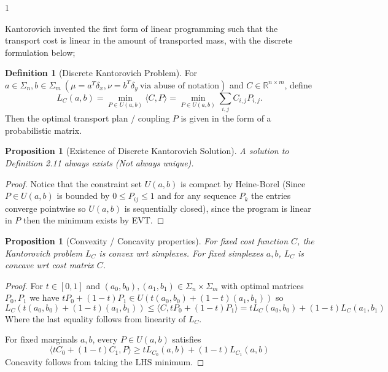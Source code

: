 \documentclass[12pt]{article}
\newtheorem{proposition}[theorem]{Proposition}
\theoremstyle{definition}
\newtheorem{definition}[theorem]{Definition}
\theoremstyle{plain}
\begin{document}
\begin{spacing}{1}
{Kantorovich invented the first form of linear programming such that the transport cost is linear in the amount of transported mass, with the discrete formulation below;

\begin{definition}[Discrete Kantorovich Problem]
    For $a \in \Sigma_n, b \in \Sigma_m \ (\mu = a^T\delta_x,  \nu = b^T \delta_y \ \text{via abuse of notation})$ and $C \in \mathbb{R}^{n \times m}$, define
    \[
    L_C(a, b) = \min_{P \in U(a, b)} \langle C, P \rangle = \min_{P \in U(a, b)} \sum_{i, j} C_{i,j} P_{i,j}.
    \]
    Then the optimal transport plan / coupling $P$ is given in the form of a probabilistic matrix.
\end{definition}

\begin{proposition}[Existence of Discrete Kantorovich Solution]
    A solution to Definition 2.11 always exists (Not always unique).
\end{proposition}

\begin{proof}
    Notice that the constraint set $U(a, b)$ is compact by Heine-Borel (Since $P \in U(a, b)$ is bounded by $0 \leq P_{ij} \leq 1$ and for any sequence $P_k$ the entries converge pointwise so $U(a, b)$ is sequentially closed), since the program is linear in $P$ then the minimum exists by EVT.
\end{proof}

\begin{proposition}[Convexity / Concavity properties]
    For fixed cost function $C$, the Kantorovich problem $L_C$ is convex wrt simplexes. For fixed simplexes $a, b$, $L_C$ is concave wrt cost matrix $C$.
\end{proposition}

\begin{proof}
    For $t \in [0, 1]$ and $(a_0, b_0), (a_1, b_1) \in \Sigma_n \times \Sigma_m$ with optimal matrices $P_0, P_1$ we have $tP_0 + (1-t)P_1 \in U(t(a_0, b_0) + (1-t)(a_1, b_1))$ so
    \[
    L_C(t(a_0, b_0) + (1-t)(a_1, b_1)) \leq \langle C, tP_0 + (1-t)P_1 \rangle = tL_C(a_0, b_0) + (1-t)L_C(a_1, b_1)
    \]
    Where the last equality follows from linearity of $L_C$.

    For fixed marginals $a, b$, every $P \in U(a, b)$ satisfies
    \[
    \langle tC_0 + (1-t)C_1, P \rangle \geq tL_{C_0}(a, b) + (1-t)L_{C_1}(a, b)
    \]
    Concavity follows from taking the LHS minimum.
\end{proof}

}
\end{spacing}
\end{document}
